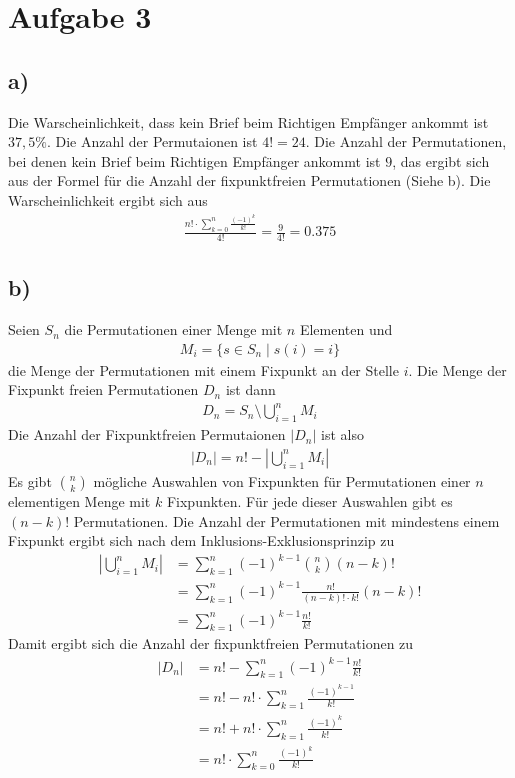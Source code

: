 \documentclass[a4paper]{scrartcl}
\begin{document}
\section*{Aufgabe 3}
\subsection*{a)}
Die Warscheinlichkeit, dass kein Brief beim Richtigen Empfänger ankommt ist $37,5\%$.
Die Anzahl der Permutaionen ist $4! = 24$.
Die Anzahl der Permutationen, bei denen kein Brief beim Richtigen Empfänger ankommt ist $9$, das ergibt sich aus der Formel 
für die Anzahl der fixpunktfreien Permutationen (Siehe b). 
Die Warscheinlichkeit ergibt sich aus
\begin{align*}
    \frac{n! \cdot \sum_{k=0}^{n} \frac{(-1)^k}{k!}}{4!} = \frac{9}{4!} = 0.375
\end{align*}

\subsection*{b)}
Seien $S_n$ die Permutationen einer Menge mit $n$ Elementen und 
\begin{align*}
    M_i = \{ s \in S_n \mid s(i) = i \} 
\end{align*}
die Menge der Permutationen mit einem Fixpunkt an der Stelle $i$.
Die Menge der Fixpunkt freien Permutationen $ D_n $ ist dann 
\begin{align*}
    D_n = S_n \setminus \bigcup_{i=1}^{n} M_i
\end{align*}
Die Anzahl der Fixpunktfreien Permutaionen $ |D_n| $ ist also
\begin{align*}
    |D_n| = n! - \left| \bigcup_{i=1}^{n} M_i \right|
\end{align*}
Es gibt $ \binom{n}{k} $ mögliche Auswahlen von Fixpunkten für Permutationen einer $n$ elementigen Menge mit $k$ Fixpunkten. Für jede dieser Auswahlen gibt es $ (n-k)! $ Permutationen. 
Die Anzahl der Permutationen mit mindestens einem Fixpunkt ergibt sich nach dem Inklusions-Exklusionsprinzip zu
\begin{align*}
    \left| \bigcup_{i=1}^{n} M_i \right| &= \sum_{k=1}^{n} (-1)^{k-1} \binom{n}{k} (n-k)! \\ 
    &= \sum_{k=1}^{n} (-1)^{k-1} \frac{n!}{(n-k)! \cdot k!} (n-k)! \\
    &= \sum_{k=1}^{n} (-1)^{k-1} \frac{n!}{k!}
\end{align*}
Damit ergibt sich die Anzahl der fixpunktfreien Permutationen zu
\begin{align*}
    |D_n| &= n! - \sum_{k=1}^{n} (-1)^{k-1} \frac{n!}{k!} \\
    &= n! - n! \cdot \sum_{k=1}^{n} \frac{(-1)^{k-1}}{k!} \\
    &= n! + n! \cdot \sum_{k=1}^{n} \frac{(-1)^{k}}{k!} \\
    &= n! \cdot \sum_{k=0}^{n} \frac{(-1)^k}{k!}
\end{align*}
\end{document}
